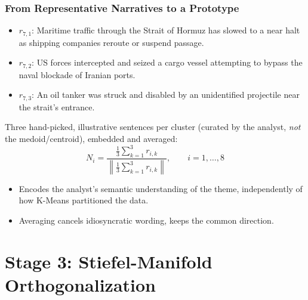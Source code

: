 \documentclass[8pt,leqno,xcolor={dvipsnames,table},aspectratio=169]{beamer}
\newenvironment{squaredblock}[2]{%
\begin{tcolorbox}[colback=adia!15,colframe=adia!85!black,title={#1}]%
#2}{\end{tcolorbox}}
\begin{document}
\begin{frame}
  \frametitle{From Representative Narratives to a Prototype}

  \begin{squaredblock}{Worked example -- Maritime Conflict \& Strait of Hormuz}
  \small
  \begin{itemize}
    \item $r_{7,1}$: Maritime traffic through the Strait of Hormuz has
      slowed to a near halt as shipping companies reroute or suspend passage.
    \item $r_{7,2}$: US forces intercepted and seized a cargo vessel
      attempting to bypass the naval blockade of Iranian ports.
    \item $r_{7,3}$: An oil tanker was struck and disabled by an
      unidentified projectile near the strait's entrance.
  \end{itemize}
  \end{squaredblock}

  \vspace{1em}
  Three hand-picked, illustrative sentences per cluster (curated by the
  analyst, \emph{not} the medoid/centroid), embedded and averaged:
  \[
  N_i = \frac{\frac{1}{3}\sum_{k=1}^3 r_{i,k}}{\left\lVert \frac{1}{3}\sum_{k=1}^3 r_{i,k}\right\rVert}, \qquad i=1,\dots,8
  \]

  \begin{itemize}
    \item Encodes the analyst's semantic understanding of the theme,
      independently of how K-Means partitioned the data.
    \item Averaging cancels idiosyncratic wording, keeps the common direction.
  \end{itemize}
\end{frame}

\section{Stage 3: Stiefel-Manifold Orthogonalization}
\end{document}

